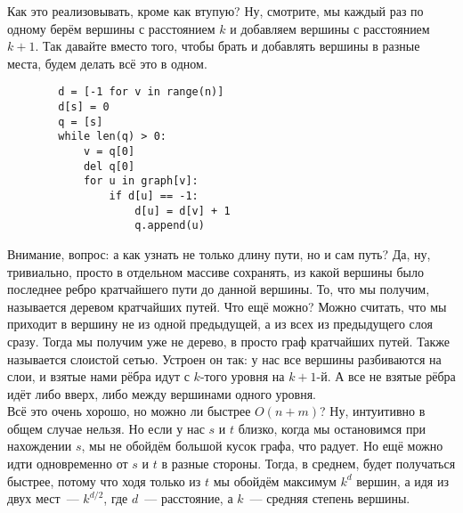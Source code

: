 \documentclass{article}
\begin{document}
    Как это реализовывать, кроме как втупую? Ну, смотрите, мы каждый раз по одному берём вершины с расстоянием $k$ и добавляем вершины с расстоянием $k+1$. Так давайте вместо того, чтобы брать и добавлять вершины в разные места, будем делать всё это в одном.
    \begin{verbatim}
        d = [-1 for v in range(n)]
        d[s] = 0
        q = [s]
        while len(q) > 0:
            v = q[0]
            del q[0]
            for u in graph[v]:
                if d[u] == -1:
                    d[u] = d[v] + 1
                    q.append(u)
    \end{verbatim}
    Внимание, вопрос: а как узнать не только длину пути, но и сам путь? Да, ну, тривиально, просто в отдельном массиве сохранять, из какой вершины было последнее ребро кратчайшего пути до данной вершины. То, что мы получим, называется деревом кратчайших путей. Что ещё можно? Можно считать, что мы приходит в вершину не из одной предыдущей, а из всех из предыдущего слоя сразу. Тогда мы получим уже не дерево, в просто граф кратчайших путей. Также называется слоистой сетью. Устроен он так: у нас все вершины разбиваются на слои, и взятые нами рёбра идут с $k$-того уровня на $k+1$-й. А все не взятые рёбра идёт либо вверх, либо между вершинами одного уровня.\\
    Всё это очень хорошо, но можно ли быстрее $O(n+m)$? Ну, интуитивно в общем случае нельзя. Но если у нас $s$ и $t$ близко, когда мы остановимся при нахождении $s$, мы не обойдём большой кусок графа, что радует. Но ещё можно идти одновременно от $s$ и $t$ в разные стороны. Тогда, в среднем, будет получаться быстрее, потому что ходя только из $t$ мы обойдём максимум $k^d$ вершин, а идя из двух мест~--- $k^{d/2}$, где $d$~--- расстояние, а $k$~--- средняя степень вершины.
\end{document}
